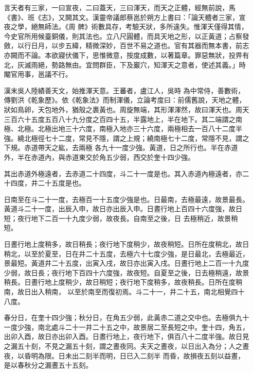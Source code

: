 
\begin{pinyinscope}

 言天者有三家，一曰宣夜，二曰蓋天，三曰渾天，而天之正體，經無前說，馬《書》、班《志》，又闕其文。漢靈帝議郎蔡邕於朔方上書曰：「論天體者三家，宣夜之學，絕無師法。《周
 髀》術數具存，考驗天狀，多所違失。惟渾天僅得其情，今史官所用候臺銅儀，則其法也。立八尺圓體，而具天地之形，以正黃道；占察發斂，以行日月，以步五緯，精微深妙，百世不易之道也。官有其器而無本書，前志亦闕而不論。本欲寢伏儀下，思惟微意，按度成數，以著篇章。罪惡無狀，投畀有北，灰滅雨絕，勢路無由。宜問群臣，下及巖穴，知渾天之意者，使述其義。」時閹官用事，邕議不行。



 漢末吳人陸績善天文，始推渾天意。王蕃者，盧江人，吳時
 為中常侍，善數術，傳劉洪《乾象歷》。依《乾象法》而制渾儀，立論考度曰：前儒舊說，天地之體，狀如鳥卵，天包地外，猶殼之裹黃也。周旋無端，其形渾渾然，故曰渾天也。周天三百六十五度五百八十九分度之百四十五，半露地上，半在地下。其二端謂之南極、北極。北極出地三十六度，南極入地亦三十六度，兩極相去一百八十二度半強。繞北極徑七十二度，常見不隱，謂之上規；繞南極七十二度，常隱不見，謂之下規。赤道帶天之紘，去兩極
 各九十一度少強。黃道，日之所行也。半在赤道外，半在赤道內，與赤道東交於角五少弱，西交於奎十四少強。



 其出赤道外極遠者，去赤道二十四度，斗二十一度是也。其入赤道內極遠者，亦二十四度，井二十五度是也。



 日南至在斗二十一度，去極百一十五度少強是也。日最南，去極最遠，故景最長。黃道斗二十一度，出辰入申，故日亦出辰入申。日晝行地上百四十六度強，故日短；夜行地下二百一十九度少弱，故夜長。自南至之後，日
 去極稍近，故景稍短。



 日晝行地上度稍多，故日稍長；夜行地下度稍少，故夜稍短。日所在度稍北，故日稍北，以至於夏至，日在井二十五度，去極六十七度少強，是日最北，去極最近，景最短。黃道井二十五度，出寅入戌，故日亦出寅入戌。日晝行地上二百一十九度少弱，故日長；夜行地下百四十六度強，故夜短。自夏至之後，日去極稍遠，故景稍長。日晝行地上度稍少，故日稍短；夜行地下度稍多，故夜稍長。日所在度稍南，故日出入稍南，
 以至於南至而復初焉。斗二十一，井二十五，南北相覺四十八度。



 春分日，在奎十四少強；秋分日，在角五少弱，此黃赤二道之交中也。去極俱九十一度少強，南北處斗二十一井二十五之中，故景居二至長短之中。奎十四，角五，出卯入酉，故日亦出卯入酉。日晝行地上，夜行地下，俱百八十二度半強。故日見之漏五十刻，不見之漏五十刻，謂之晝夜同。夫天之晝夜，以日出入為分；人之晝夜，以昏明為限。日未出二刻半而明，日已入二刻半
 而昏，故損夜五刻以益晝，是以春秋分之漏晝五十五刻。




\end{pinyinscope}
